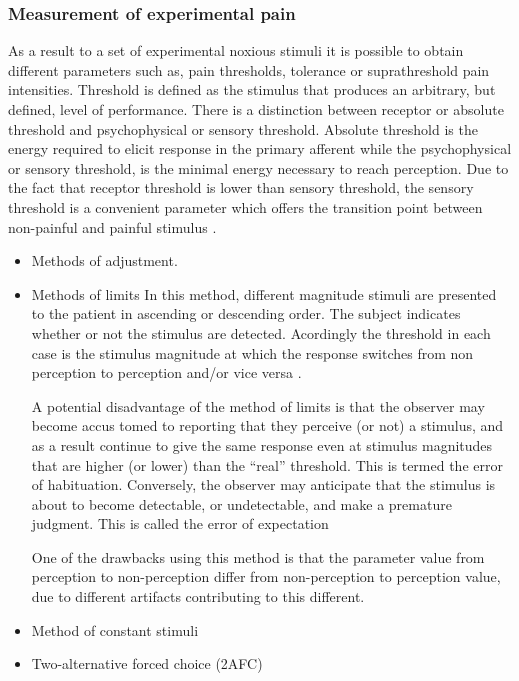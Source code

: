 \subsubsection{Measurement of experimental pain}
 As a result to a set of experimental noxious stimuli it is possible to obtain different parameters such as, pain thresholds, tolerance or suprathreshold pain intensities. Threshold is defined as the stimulus that produces an arbitrary, but defined, level of performance. There is a distinction between receptor or absolute threshold and psychophysical or sensory threshold. Absolute threshold is the energy required to elicit response in the primary afferent while the psychophysical or sensory threshold, is the minimal energy necessary to reach perception. Due to the fact that receptor threshold is lower than sensory threshold, the sensory threshold is a convenient parameter which offers the transition point between non-painful and painful stimulus \cite{neurop_exam}.
\begin{itemize}
	
	\item Methods of adjustment. 
	\item Methods of limits
	In this method, different magnitude stimuli are presented to the patient in ascending or descending order. The subject indicates whether or not the stimulus are detected. Acordingly the threshold in each case is the stimulus magnitude at which the response switches from non perception to perception and/or vice versa \cite{chapter3}.
	
	A potential disadvantage of the method of limits is that the observer may become accus tomed to reporting that they perceive (or not) a stimulus, and as a result continue to give the same response even at stimulus magnitudes that are higher (or lower) than the “real” threshold. This is termed the error of habituation. Conversely, the observer may anticipate that the stimulus is about to become detectable, or undetectable, and make a premature judgment. This is called the error of expectation
	
	One of the drawbacks using this method is that the parameter value from perception to non-perception differ from non-perception to perception value, due to different artifacts contributing to this different.
	\item Method of constant stimuli
	\item Two-alternative forced choice (2AFC)
\end{itemize}